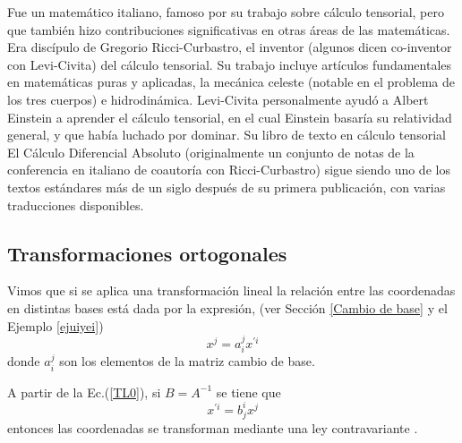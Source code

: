 \begin{parchment}{ Fue un matemático italiano, famoso por su trabajo sobre cálculo tensorial, pero que también hizo contribuciones significativas en otras áreas de las matemáticas. Era discípulo de Gregorio Ricci-Curbastro, el inventor (algunos dicen co-inventor con Levi-Civita) del cálculo tensorial. Su trabajo incluye artículos fundamentales en matemáticas puras y aplicadas, la mecánica celeste (notable en el problema de los tres cuerpos) e hidrodinámica.
Levi-Civita personalmente ayudó a Albert Einstein a aprender el cálculo tensorial, en el cual Einstein basaría su relatividad general, y que había luchado por dominar. Su libro de texto en cálculo tensorial El Cálculo Diferencial Absoluto (originalmente un conjunto de notas de la conferencia en italiano de coautoría con Ricci-Curbastro) sigue siendo uno de los textos estándares más de un siglo después de su primera publicación, con varias traducciones disponibles. \cite{levi}}
\end{parchment}











\subsection{Transformaciones ortogonales }

Vimos que si se aplica una transformación lineal la relación entre las coordenadas en distintas bases está dada por la expresión, (ver Sección \ref{Cambio de base} y el Ejemplo \ref{ejuiyei})
\begin{equation}
\label{TL0}
x^{j} =  a^{j}_{i}x^{\prime i}
\end{equation}
donde $a^{j}_{i}$ son los elementos de la matriz cambio de base. 

\bigskip


 A partir de la Ec.(\ref{TL0}), si $B=A^{-1}$ se tiene que 
\begin{equation}
\label{xpxnueva}
 x^{\prime i}= b^i_{j}x^j 
\end{equation}
\noindent
entonces las coordenadas se transforman mediante una ley contravariante .
\bigskip

